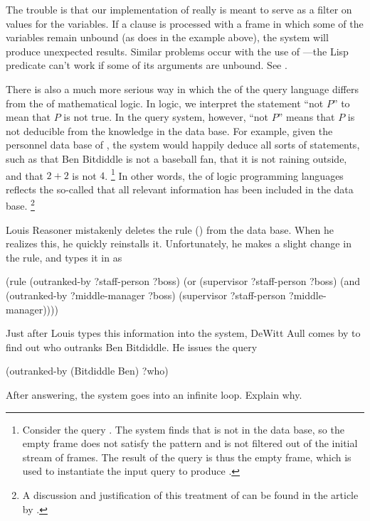 The trouble is that our implementation of  really is meant to serve as a filter on values for the variables.
If a  clause is processed with a frame in which some of the variables remain unbound (as does  in the example above), the system will produce unexpected results.
Similar problems occur with the use of ---the Lisp predicate can’t work if some of its arguments are unbound.
See .

There is also a much more serious way in which the  of the query language differs from the  of mathematical logic.
In logic, we interpret the statement “not \( P \)” to mean that \( P \) is not true.
In the query system, however, “not \( P \)” means that \( P \) is not deducible from the knowledge in the data base.
For example, given the personnel data base of , the system would happily deduce all sorts of  statements, such as that Ben Bitdiddle is not a baseball fan, that it is not raining outside, and that \( 2 + 2 \) is not \( 4 \).%
\footnote{
	Consider the query .
	The system finds that  is not in the data base, so the empty frame does not satisfy the pattern and is not filtered out of the initial stream of frames.
	The result of the query is thus the empty frame, which is used to instantiate the input query to produce .
}
In other words, the  of logic programming languages reflects the so-called  that all relevant information has been included in the data base.%
\footnote{
	A discussion and justification of this treatment of  can be found in the article by .
}



\begin{exercise}
	\label{Exercise 4.64}
	Louis Reasoner mistakenly deletes the  rule () from the data base.
	When he realizes this, he quickly reinstalls it.
	Unfortunately, he makes a slight change in the rule, and types it in as
	\begin{scheme}
	  (rule (outranked-by ?staff-person ?boss)
	        (or (supervisor ?staff-person ?boss)
	            (and (outranked-by ?middle-manager ?boss)
	                 (supervisor ?staff-person
	                             ?middle-manager))))
	\end{scheme}
	Just after Louis types this information into the system, DeWitt Aull comes by
	to find out who outranks Ben Bitdiddle. He issues the query
	\begin{scheme}
	  (outranked-by (Bitdiddle Ben) ?who)
	\end{scheme}
	After answering, the system goes into an infinite loop.  Explain why.
\end{exercise}



